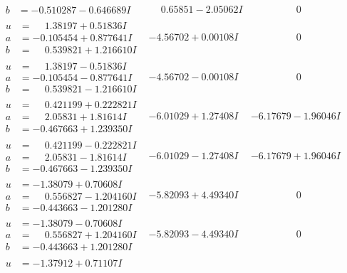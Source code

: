 \documentclass[1p]{elsarticle_modified}
\theoremstyle{definition}
\begin{document}
$$\begin{array}{c|c|c}
\begin{aligned}
b &= -0.510287 - 0.646689 I\end{aligned}
 & \phantom{-}0.65851 - 2.05062 I & \phantom{-0.000000 } 0 \\ \hline\begin{aligned}
u &= \phantom{-}1.38197 + 0.51836 I \\
a &= -0.105454 + 0.877641 I \\
b &= \phantom{-}0.539821 + 1.216610 I\end{aligned}
 & -4.56702 + 0.00108 I & \phantom{-0.000000 } 0 \\ \hline\begin{aligned}
u &= \phantom{-}1.38197 - 0.51836 I \\
a &= -0.105454 - 0.877641 I \\
b &= \phantom{-}0.539821 - 1.216610 I\end{aligned}
 & -4.56702 - 0.00108 I & \phantom{-0.000000 } 0 \\ \hline\begin{aligned}
u &= \phantom{-}0.421199 + 0.222821 I \\
a &= \phantom{-}2.05831 + 1.81614 I \\
b &= -0.467663 + 1.239350 I\end{aligned}
 & -6.01029 + 1.27408 I & -6.17679 - 1.96046 I \\ \hline\begin{aligned}
u &= \phantom{-}0.421199 - 0.222821 I \\
a &= \phantom{-}2.05831 - 1.81614 I \\
b &= -0.467663 - 1.239350 I\end{aligned}
 & -6.01029 - 1.27408 I & -6.17679 + 1.96046 I \\ \hline\begin{aligned}
u &= -1.38079 + 0.70608 I \\
a &= \phantom{-}0.556827 - 1.204160 I \\
b &= -0.443663 - 1.201280 I\end{aligned}
 & -5.82093 + 4.49340 I & \phantom{-0.000000 } 0 \\ \hline\begin{aligned}
u &= -1.38079 - 0.70608 I \\
a &= \phantom{-}0.556827 + 1.204160 I \\
b &= -0.443663 + 1.201280 I\end{aligned}
 & -5.82093 - 4.49340 I & \phantom{-0.000000 } 0 \\ \hline\begin{aligned}
u &= -1.37912 + 0.71107 I \\

\end{aligned}
\end{array}$$
\end{document}
